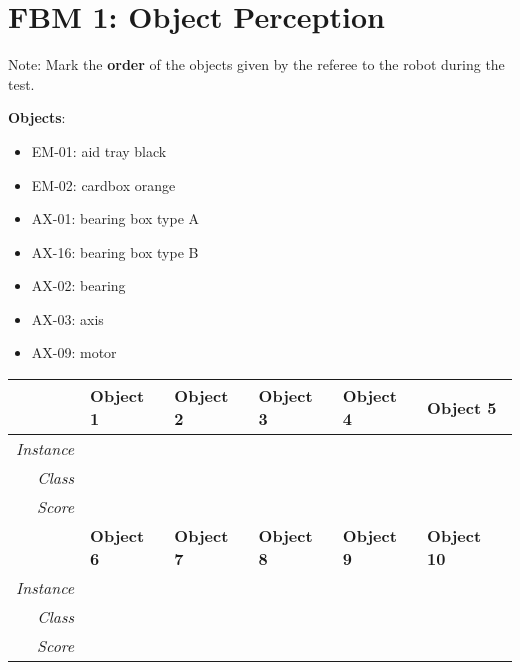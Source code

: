 \section*{FBM 1: Object Perception}


\vspace{0.3cm}


\noindent Note: Mark the \textbf{order} of the objects given by the referee to the robot during the test.

\noindent \textbf{Objects}:
\begin{itemize}
    \setlength\itemsep{0cm}
	\item EM-01: aid tray black
	\item EM-02: cardbox orange
	\item AX-01: bearing box type A
	\item AX-16: bearing box type B
	\item AX-02: bearing
	\item AX-03: axis
	\item AX-09: motor
\end{itemize}

\vspace{0.3cm}

\begin{tabular}{|r|l|l|l|l|l|}
\hline
         & \textbf{Object 1} & \textbf{Object 2}  & \textbf{Object 3}   & \textbf{Object 4}   & \textbf{Object 5} \\ \hline
\textit{Instance}	 &          &           &            &            &          \\ \hline
\textit{Class}	 &          &           &            &            &          \\ \hline
\textit{Score}	 &          &           &            &            &          \\ \hline

         & \textbf{Object 6}  & \textbf{Object 7}   & \textbf{Object 8}   & \textbf{Object 9}  & \textbf{Object 10}\\ \hline
\textit{Instance}	 &          &           &            &            &          \\ \hline
\textit{Class}	 &          &           &            &            &          \\ \hline
\textit{Score}	 &          &           &            &            &          \\ \hline
\end{tabular}

\vspace{0.3cm}

